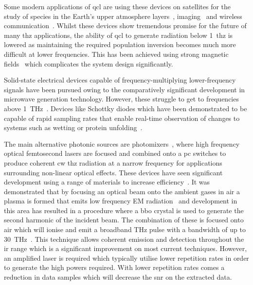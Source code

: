 Some modern applications of \acrshort{qcl} are using these devices on satellites for the study of species in the Earth's upper atmosphere layers~\cite{Swinyard2016}, imaging~\cite{Dean2014} and wireless communication~\cite{Chen2011}. Whilst these devices show tremendous promise for the future of many \acrshort{thz} applications, the ability of \acrshort{qcl} to generate radiation below \SI{1}{\acrshort{thz}} is lowered as maintaining the required population inversion becomes much more difficult at lower frequencies. This has been achieved using strong magnetic fields~\cite{Wade2008} which complicates the system design significantly.

Solid\nobreakdash-state electrical devices capable of frequency\nobreakdash-multiplying lower\nobreakdash-frequency signals have been pursued owing to the comparatively significant development in microwave generation technology. However, these struggle to get to frequencies above \SI{1}{THz}~\cite{Kinev2021}. Devices like Schottky diodes which have been demonstrated to be capable of rapid sampling rates that enable real\nobreakdash-time observation of changes to systems such as wetting or protein unfolding~\cite{Rettich2015}.

The main alternative photonic sources are photomixers~\cite{McIntosh1995}, where high frequency optical femtosecond lasers are focused and combined onto a \acrshort{pc} switches to produce coherent \acrshort{cw} \acrshort{thz} radiation at a narrow frequency for applications surrounding non-linear optical effects. These devices have seen significant development using a range of materials to increase efficiency~\cite{AlMuhadar2022}.
It was demonstrated that by focusing an optical beam onto the ambient gases in air a plasma is formed that emits low frequency EM radiation~\cite{Hamster1993} and development in this area has resulted in a procedure where a \acrfull{bbo} crystal is used to generate the second harmonic of the incident beam. The combination of these is focused onto air which will ionise and emit a broadband THz pulse with a bandwidth of up to \SI{30}{THz}~\cite{Dai2011}. This technique allows coherent emission and detection throughout the \acrshort{ir} range which is a significant improvement on most current techniques. However, an amplified laser is required which typically utilise lower repetition rates in order to generate the high powers required. With lower repetition rates comes a reduction in data samples which will decrease the \acrshort{snr} on the extracted data.

